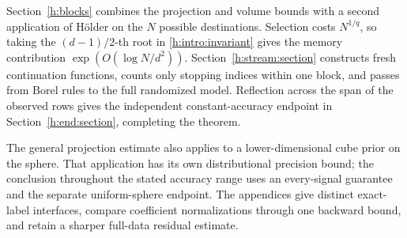 Section~\ref{h:blocks} combines the projection and volume bounds
with a second application of H\"older on the \(N\) possible
destinations. Selection costs \(N^{1/q}\), so taking the
\((d-1)/2\)-th root in \eqref{h:intro:invariant} gives the memory
contribution \(\exp(O(\log N/d^2))\).
Section~\ref{h:stream:section} constructs fresh continuation
functions, counts only stopping indices within one block, and passes
from Borel rules to the full randomized model. Reflection across the
span of the observed rows gives the independent constant-accuracy
endpoint in Section~\ref{h:end:section}, completing the theorem.

The general projection estimate also applies to a lower-dimensional
cube prior on the sphere. That application has its own distributional
precision bound; the conclusion throughout the stated accuracy range
uses an every-signal guarantee and the separate uniform-sphere
endpoint. The appendices give distinct exact-label interfaces,
compare coefficient normalizations through one backward bound,
and retain a sharper full-data residual estimate.
